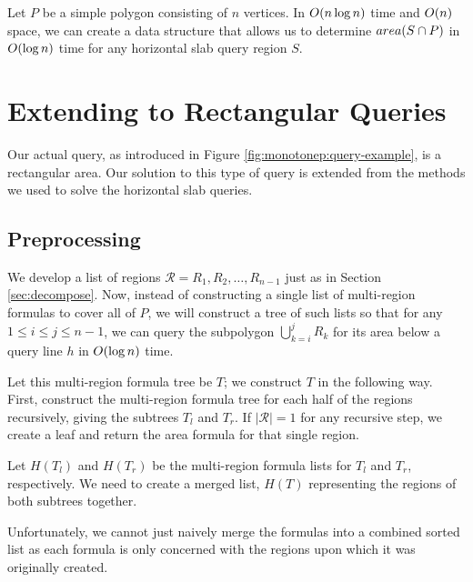 \begin{corollary}
\label{cor:monotonep:simplep-area}
Let $P$ be a simple polygon consisting of $n$ vertices. In $O\!\left(n \log{n}\right)$ time and $O\!\left(n\right)$ space, we can create a data structure that allows us to determine $area(S \cap P)$ in $O\!\left(\log{n}\right)$ time for any horizontal slab query region $S$.
\end{corollary}


\section{Extending to Rectangular Queries}
\label{:monotonep:rect}

Our actual query, as introduced in Figure \ref{fig:monotonep:query-example}, is a rectangular area. Our solution to this type of query is extended from the methods we used to solve the horizontal slab queries.

\subsection{Preprocessing}
\label{:monotonep:rect:pre}

We develop a list of regions $\mathcal{R} = R_1, R_2, \ldots, R_{n-1}$ just as in Section \ref{sec:decompose}.  Now, instead of constructing a single list of multi-region formulas to cover all of $P$, we will construct a tree of such lists so that for any $1 \leq i \leq j \leq n-1$, we can query the subpolygon $\bigcup_{k=i}^{j}{R_k}$ for its area below a query line $h$ in $O\!\left(\log{n}\right)$ time.

Let this multi-region formula tree be $T$; we construct $T$ in the following way. First, construct the multi-region formula tree for each half of the regions recursively, giving the subtrees $T_l$ and $T_r$. If $|\mathcal{R}| = 1$ for any recursive step, we create a leaf and return the area formula for that single region.

Let $H(T_l)$ and $H(T_r)$ be the multi-region formula lists for $T_l$ and $T_r$, respectively. We need to create a merged list, $H(T)$ representing the regions of both subtrees together. 

Unfortunately, we cannot just naively merge the formulas into a combined sorted list as each formula is only concerned with the regions upon which it was originally created. 

